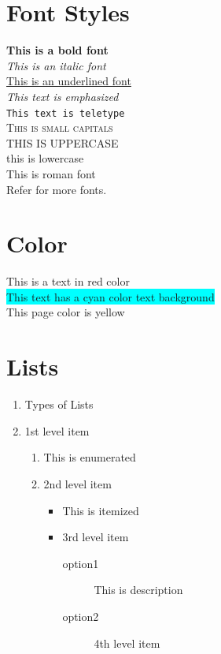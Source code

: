 \documentclass[12pt]{article}%
\begin{document}
\section{Font Styles}
\textbf{This is a bold font}\\
\textit{This is an italic font}\\
\underline{This is an underlined font}\\
\emph{This text is emphasized}\\
\texttt{This text is teletype}\\
\textsc{This is small capitals}\\
\uppercase{This is uppercase}\\
\lowercase{This is lowercase}\\
\textrm{This is roman font}\\
Refer \cite{hoenig1998tex} for more fonts.\\

\section{Color}
{\color{red} This is a text in red color} \\
{\colorbox{cyan}{This text has a cyan color text background}}\\
This page color is yellow\\
\pagecolor{yellow}

\newpage
\section{Lists} \label{sec:lists}
\begin{enumerate}
     \item Types of Lists
     \item 1st level item
       \begin{enumerate}
       \item This is enumerated
       \item 2nd level item
         \begin{itemize}
            \item This is itemized
            \item 3rd level item
            \begin{description}
                \item[option1] This is description
                \item[option2] 4th level item
            \end{description}
       \end{itemize}
     \end{enumerate}
   \end{enumerate}
\end{document}
